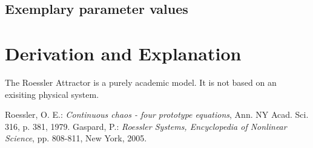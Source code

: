 \documentclass[10pt,a4paper]{article}
\begin{document}
	\subsection{Exemplary parameter values}
	

	
	\section{Derivation and Explanation} %
	
	The Roessler Attractor is a purely academic model. It is not based on an exisiting physical system.
	
	
	\begin{thebibliography}{10}		
		Roessler, O. E.: 
		\textit{Continuous chaos - four prototype equations}, Ann. NY Acad. Sci. 316, p. 381, 1979.
		Gaspard, P.: 
		\textit{Roessler Systems, Encyclopedia of Nonlinear Science}, pp. 808-811, New York, 2005.
	\end{thebibliography}
\end{document}
